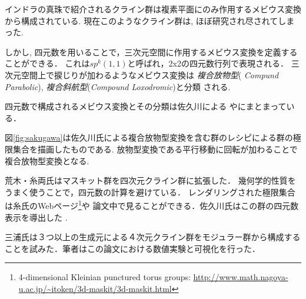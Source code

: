 インドラの真珠で紹介されるクライン群は複素平面にのみ作用するメビウス変換から構成されている.
現在このようなクライン群は, ほぼ研究され尽されてしまった.

しかし, 四元数を用いることで，三次元空間に作用するメビウス変換を定義することができる．
これは$sp^k(1, 1)$と呼ばれ，2x2の四元数行列で表現される．
三次元空間上で捩じりが加わるようなメビウス変換は \emph{複合放物型}({\it
Compund Parabolic}), \emph{複合斜航型}({\it Compound Loxodromic})と分類
される.

四元数で構成されるメビウス変換とその分類は佐久川による
\cite{sakugawaMaster}や\cite{accidentalParabolic}にまとまっている．

図\ref{fig:sakugawa}は佐久川氏による複合放物型変換を含む群のレシピによる群の極限集合を描画したものである.
放物型変換である平行移動に回転が加わることで複合放物型変換となる.

荒木・糸両氏はマスキット群を四次元クライン群に拡張した\cite{maskit}．
幾何学的性質をうまく使うことで，四元数の計算を避けている．
レンダリングされた極限集合は糸氏のWebページ\footnote{4-dimensional
Kleinian punctured torus groups:
\url{http://www.math.nagoya-u.ac.jp/~itoken/3d-maskit/3d-maskit.html}}や
論文中で見ることができる．佐久川氏はこの群の四元数表示を導出した
\cite{sakugawa4d}.

三浦氏は３つ以上の生成元による４次元クライン群をモジュラー群から構成することを試みた\cite{miura}．筆者はこの論文における数値実験と可視化を行った．

